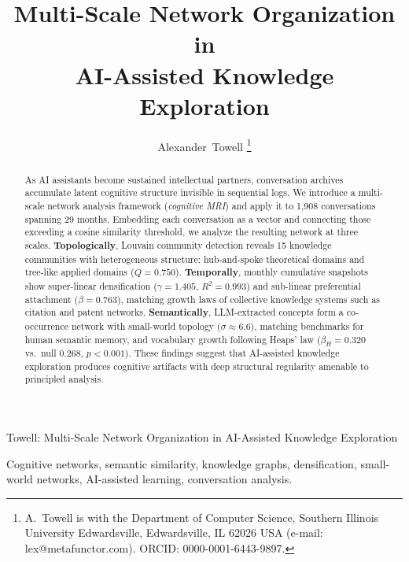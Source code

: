 \documentclass[journal]{IEEEtran}
\begin{document}
\title{Multi-Scale Network Organization in\\AI-Assisted Knowledge Exploration}

\author{Alexander~Towell%
  \thanks{A.\ Towell is with the Department of Computer Science,
    Southern Illinois University Edwardsville, Edwardsville, IL 62026 USA
    (e-mail: lex@metafunctor.com).
    ORCID: 0000-0001-6443-9897.}%
}

%
{Towell: Multi-Scale Network Organization in AI-Assisted Knowledge Exploration}

\maketitle

\begin{abstract}
As AI assistants become sustained intellectual partners, conversation
archives accumulate latent cognitive structure invisible in sequential
logs.  We introduce a multi-scale network analysis framework
(\emph{cognitive MRI}) and apply it to 1,908 conversations spanning 29
months.  Embedding each conversation as a vector and connecting those
exceeding a cosine similarity threshold, we analyze the resulting
network at three scales.  \textbf{Topologically}, Louvain community
detection reveals 15 knowledge communities with heterogeneous
structure: hub-and-spoke theoretical domains and tree-like applied
domains ($Q = 0.750$).  \textbf{Temporally}, monthly cumulative
snapshots show super-linear densification ($\gamma = 1.405$,
$R^2 = 0.993$) and sub-linear preferential attachment ($\beta = 0.763$),
matching growth laws of collective knowledge systems such as citation
and patent networks.  \textbf{Semantically}, LLM-extracted concepts
form a co-occurrence network with small-world topology
($\sigma \approx 6.6$), matching benchmarks for human semantic memory,
and vocabulary growth following Heaps' law
($\beta_H = 0.320$ vs.\ null $0.268$, $p < 0.001$).
These findings suggest that AI-assisted knowledge exploration produces
cognitive artifacts with deep structural regularity amenable to
principled analysis.
\end{abstract}

\begin{IEEEkeywords}
Cognitive networks, semantic similarity, knowledge graphs, densification,
small-world networks, AI-assisted learning, conversation analysis.
\end{IEEEkeywords}
\end{document}
